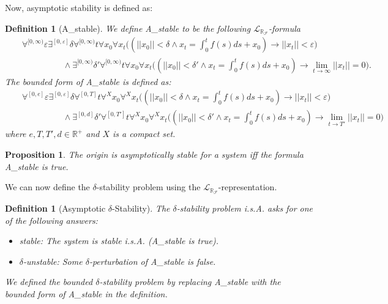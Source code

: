 \documentclass[10pt]{article}
\theoremstyle{plain}
\newtheorem{proposition}[theorem]{Proposition}
\newtheorem{definition}[theorem]{Definition}
\theoremstyle{definition}
\newcommand{\lrf}{\mathcal{L}_{\mathbb{R}_{\mathcal{F}}}}
\begin{document}
Now, asymptotic stability is defined as:
\begin{definition}[{\sf A\_stable}]
We define {\sf A\_stable} to be the following $\lrf$-formula
\begin{eqnarray*}
& &\forall^{[0,\infty)} \varepsilon\exists^{[0,\varepsilon]} \delta\forall^{[0,\infty)} t\forall x_0\forall x_t\Big((||x_0||<\delta \wedge x_t = \int_0^t f(s)ds + x_0 )\rightarrow ||x_t||<\varepsilon\Big)\\
& &\hspace{2cm}\wedge \exists^{[0,\infty)} \delta'  \forall^{[0,\infty)} t\forall x_0\forall x_t\Big( (||x_0||<\delta'\wedge x_t = \int_0^t f(s)ds + x_0 )\rightarrow \lim_{t\rightarrow \infty} ||x_t|| = 0\Big). 
\end{eqnarray*}
The bounded form of {\sf A\_stable} is defined as:
\begin{eqnarray*}
& &\forall^{[0,e]} \varepsilon\exists^{[0,\varepsilon]} \delta\forall^{[0,T]} t\forall^X x_0\forall^X x_t\Big((||x_0||<\delta \wedge x_t = \int_0^t f(s)ds + x_0 )\rightarrow ||x_t||<\varepsilon\Big)\\
& &\hspace{2cm}\wedge \exists^{[0,d]} \delta'  \forall^{[0,T']} t\forall^X x_0\forall^X x_t\Big( (||x_0||<\delta'\wedge x_t = \int_0^t f(s)ds + x_0 )\rightarrow \lim_{t\rightarrow T'} ||x_t|| = 0\Big) 
\end{eqnarray*}
where $e,T,T',d\in \mathbb{R}^+$ and $X$ is a compact set. 
\end{definition}
\begin{proposition}
The origin is asymptotically stable for a system iff the formula {\sf A\_stable} is true. 
\end{proposition}
We can now define the $\delta$-stability problem using the $\lrf$-representation.  
\begin{definition}[Asymptotic $\delta$-Stability]\label{sl}
The $\delta$-stability problem i.s.A. asks for one of the following answers:
\begin{itemize}
\item {\sf stable}: The system is stable i.s.A. ({\sf A\_stable} is true). 
\item {\sf $\delta$-unstable}: Some $\delta$-perturbation of {\sf A\_stable} is false. 
\end{itemize}
We defined the {\em bounded} $\delta$-stability problem by replacing {\sf A\_stable} with the bounded form of {\sf A\_stable} in the definition. 
\end{definition}
\end{document}
